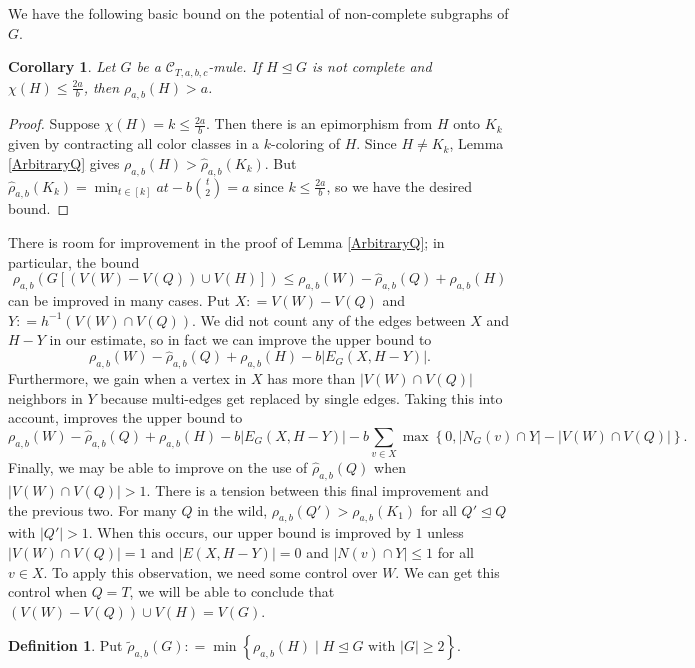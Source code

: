 \documentclass[12pt]{amsart}
\theoremstyle{plain}
\newtheorem{cor}[thm]{Corollary}
\theoremstyle{definition}
\newtheorem{defn}{Definition}
\theoremstyle{remark}
\newcommand{\fancy}[1]{\mathcal{#1}}
\newcommand{\C}{\fancy{C}}
\newcommand{\set}[1]{\left\{ #1 \right\}}
\newcommand{\setbs}[2]{\left\{ #1 \mid #2 \right\}}
\newcommand{\card}[1]{\left|#1\right|}
\newcommand{\irange}[1]{\left[#1\right]}
\newcommand{\parens}[1]{\left( #1 \right)}
\newcommand{\brackets}[1]{\left[ #1 \right]}
\newcommand{\DefinedAs}{\mathrel{\mathop:}=}
\begin{document}
We have the following basic bound on the potential of non-complete subgraphs of $G$.
\begin{cor}\label{CompleteQ}
Let $G$ be a $\C_{T,a,b,c}$-mule. If $H \unlhd G$ is not complete and $\chi(H) \le \frac{2a}{b}$, then $\rho_{a,b}(H) > a$.
\end{cor}
\begin{proof}
Suppose $\chi(H) = k \le \frac{2a}{b}$.  Then there is an epimorphism from $H$ onto $K_k$ given by contracting all color classes in a $k$-coloring of $H$.  Since $H \ne K_k$, Lemma \ref{ArbitraryQ} gives
$\rho_{a,b}(H) > \hat{\rho}_{a,b}(K_k)$.  But $\hat{\rho}_{a,b}(K_k) = \min_{t \in \irange{k}} at - b\binom{t}{2} = a$ since $k \le \frac{2a}{b}$, so we have the desired bound.
\end{proof}

There is room for improvement in the proof of Lemma \ref{ArbitraryQ}; in particular, the bound 
\[\rho_{a,b}\parens{G\brackets{(V(W) - V(Q)) \cup V(H)}} \le \rho_{a,b}(W) - \hat{\rho}_{a,b}(Q) + \rho_{a,b}(H)\] can be improved in many cases. Put $X \DefinedAs V(W) - V(Q)$ and $Y \DefinedAs h^{-1}(V(W) \cap V(Q))$.  We did not count any of the edges between $X$ and $H - Y$ in our estimate, so in fact we can improve the upper bound to \[\rho_{a,b}(W) - \hat{\rho}_{a,b}(Q) + \rho_{a,b}(H) - b\card{E_G(X,H - Y)}.\]  Furthermore, we gain when a vertex in $X$ has more than $\card{V(W) \cap V(Q)}$ neighbors in $Y$ because multi-edges get replaced by single edges.  Taking this into account, improves the upper bound to \[\rho_{a,b}(W) - \hat{\rho}_{a,b}(Q) + \rho_{a,b}(H) - b\card{E_G(X,H - Y)} - b\sum_{v \in X} \max\set{0, \card{N_G(v) \cap Y} - \card{V(W) \cap V(Q)}}.\]  Finally, we may be able to improve on the use of $\hat{\rho}_{a,b}(Q)$ when $\card{V(W) \cap V(Q)} > 1$.  There is a tension between this final improvement and the previous two.  For many $Q$ in the wild, $\rho_{a,b}(Q') > \rho_{a,b}(K_1)$ for all $Q' \unlhd Q$ with $\card{Q'} > 1$.  When this occurs, our upper bound is improved by $1$ unless $\card{V(W) \cap V(Q)} = 1$ and $\card{E(X,H - Y)} = 0$ and $\card{N(v) \cap Y} \le 1$ for all $v \in X$.  To apply this observation, we need some control over $W$. We can get this control when $Q = T$, we will be able to conclude that $(V(W) - V(Q)) \cup V(H) = V(G)$. 

\begin{defn}
Put $\tilde{\rho}_{a,b}(G) \DefinedAs \min\setbs{\rho_{a,b}(H)}{H \unlhd G \text{ with } |G| \ge 2}$.
\end{defn}
\end{document}
